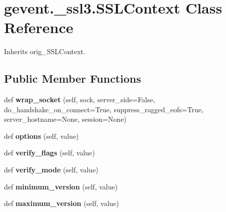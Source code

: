 \hypertarget{classgevent_1_1__ssl3_1_1_s_s_l_context}{}\section{gevent.\+\_\+ssl3.\+S\+S\+L\+Context Class Reference}
\label{classgevent_1_1__ssl3_1_1_s_s_l_context}


Inherits orig\+\_\+\+S\+S\+L\+Context.

\subsection*{Public Member Functions}
\begin{DoxyCompactItemize}
\item 
\mbox{\label{classgevent_1_1__ssl3_1_1_s_s_l_context_a934c8ffd355bc619a6a4f67cf7b42fcd}} 
def {\bfseries wrap\+\_\+socket} (self, sock, server\+\_\+side=False, do\+\_\+handshake\+\_\+on\+\_\+connect=True, suppress\+\_\+ragged\+\_\+eofs=True, server\+\_\+hostname=None, session=None)
\item 
\mbox{\label{classgevent_1_1__ssl3_1_1_s_s_l_context_ad9454b7e9e1081230065877461d7d85b}} 
def {\bfseries options} (self, value)
\item 
\mbox{\label{classgevent_1_1__ssl3_1_1_s_s_l_context_aefa512ad728b7a579d303a5f4af0e9af}} 
def {\bfseries verify\+\_\+flags} (self, value)
\item 
\mbox{\label{classgevent_1_1__ssl3_1_1_s_s_l_context_a767ccbcdc24b85e459158a10af56235c}} 
def {\bfseries verify\+\_\+mode} (self, value)
\item 
\mbox{\label{classgevent_1_1__ssl3_1_1_s_s_l_context_a94e33eb8029010dd4e1d79111f7cf351}} 
def {\bfseries minimum\+\_\+version} (self, value)
\item 
\mbox{\label{classgevent_1_1__ssl3_1_1_s_s_l_context_a4492b914c7396b3917ff098f09278a26}} 
def {\bfseries maximum\+\_\+version} (self, value)
\end{DoxyCompactItemize}
